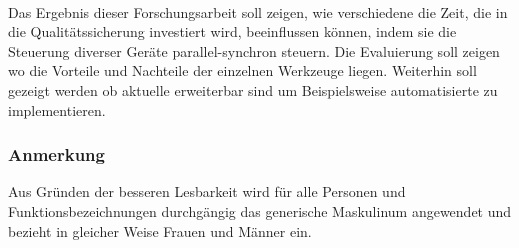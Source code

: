 \\
Das Ergebnis dieser Forschungsarbeit soll zeigen, wie verschiedene  die Zeit, die in die Qualitätssicherung investiert wird, beeinflussen können, indem sie die Steuerung diverser Geräte parallel-synchron steuern. Die Evaluierung soll zeigen wo die Vorteile und Nachteile der einzelnen Werkzeuge liegen. Weiterhin soll gezeigt werden ob aktuelle  erweiterbar sind um Beispielsweise automatisierte  zu implementieren.

\subsubsection{Anmerkung}
Aus Gründen der besseren Lesbarkeit wird für alle Personen und Funktionsbezeichnungen durchgängig das generische Maskulinum angewendet und bezieht in gleicher Weise Frauen und Männer ein.